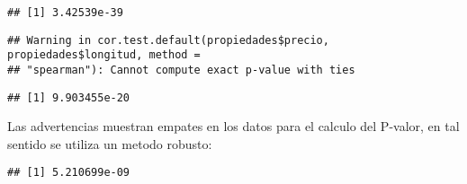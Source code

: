 \documentclass[
]{article}
\newenvironment{Shaded}{\begin{snugshade}}{\end{snugshade}}
\newcommand{\AttributeTok}[1]{\textcolor[rgb]{0.77,0.63,0.00}{#1}}
\newcommand{\CommentTok}[1]{\textcolor[rgb]{0.56,0.35,0.01}{\textit{#1}}}
\newcommand{\ConstantTok}[1]{\textcolor[rgb]{0.00,0.00,0.00}{#1}}
\newcommand{\FunctionTok}[1]{\textcolor[rgb]{0.00,0.00,0.00}{#1}}
\newcommand{\NormalTok}[1]{#1}
\newcommand{\SpecialCharTok}[1]{\textcolor[rgb]{0.00,0.00,0.00}{#1}}
\newcommand{\StringTok}[1]{\textcolor[rgb]{0.31,0.60,0.02}{#1}}
\begin{document}
\begin{verbatim}
## [1] 3.42539e-39
\end{verbatim}

\begin{Shaded}
\end{Shaded}

\begin{verbatim}
## Warning in cor.test.default(propiedades$precio, propiedades$longitud, method =
## "spearman"): Cannot compute exact p-value with ties
\end{verbatim}

\begin{verbatim}
## [1] 9.903455e-20
\end{verbatim}

Las advertencias muestran empates en los datos para el calculo del
P-valor, en tal sentido se utiliza un metodo robusto:

\begin{Shaded}
\end{Shaded}

\begin{verbatim}
## [1] 5.210699e-09
\end{verbatim}

\begin{Shaded}
\end{Shaded}
\end{document}

